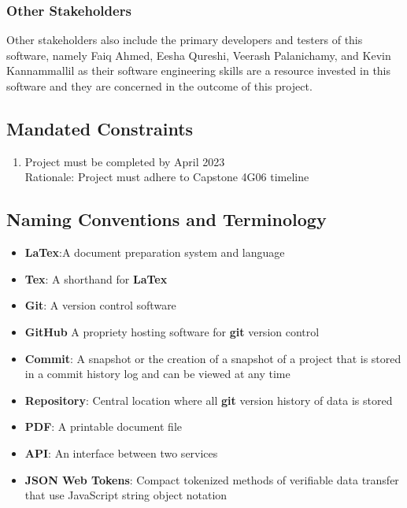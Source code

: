 \documentclass[12pt, titlepage]{article}
\begin{document}
	\subsubsection{Other Stakeholders}
	Other stakeholders also include the primary developers and testers of this software, namely Faiq Ahmed, Eesha Qureshi, Veerash Palanichamy, and Kevin Kannammallil as their software engineering skills are a resource invested in this software and they are concerned in the outcome of this project.
	
	\subsection{Mandated Constraints}
	
	\begin{enumerate}[{MC}1.]
		\item Project must be completed by April 2023
		\\Rationale: Project must adhere to Capstone 4G06 timeline
	\end{enumerate}
	
	\subsection{Naming Conventions and Terminology}
	
	\begin{itemize}
		\item \textbf{LaTex}:A document preparation system and language
		\item \textbf{Tex}: A shorthand for \textbf{LaTex}
		\item \textbf{Git}: A version control software
		\item \textbf{GitHub} A propriety hosting software for \textbf{git} version control
		\item \textbf{Commit}: A snapshot or the creation of a snapshot of a project that is stored in a commit history log and can be viewed at any time
		\item \textbf{Repository}: Central location where all \textbf{git} version history of data is stored
		\item \textbf{PDF}: A printable document file
		\item \textbf{API}: An interface between two services
		\item \textbf{JSON Web Tokens}: Compact tokenized methods of verifiable data transfer that use JavaScript string object notation
	\end{itemize}
	
\end{document}
